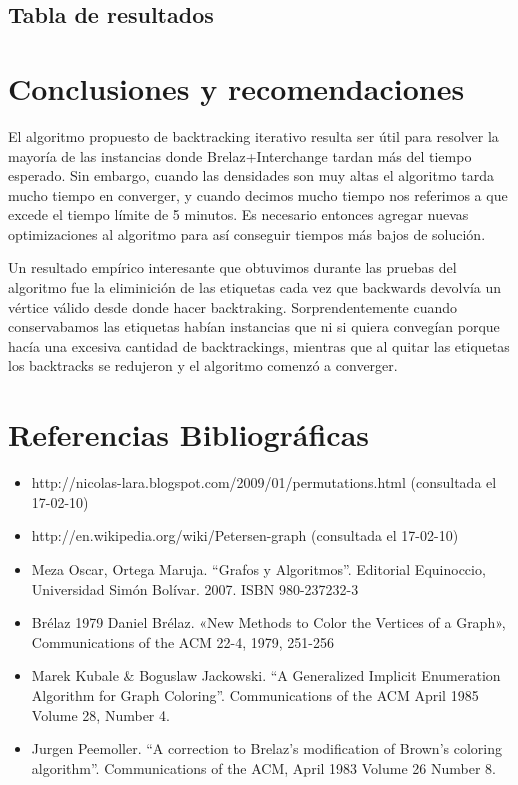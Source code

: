 \documentclass[a4paper,10pt]{article}
\begin{document}
\subsection{Tabla de resultados}
\newpage

\section{Conclusiones y recomendaciones}
El algoritmo propuesto de backtracking iterativo resulta ser 
útil para resolver la mayoría de las instancias donde Brelaz+Interchange 
tardan más del tiempo esperado. Sin embargo, cuando las densidades son muy altas 
el algoritmo tarda mucho tiempo en converger, y cuando decimos mucho tiempo nos referimos 
a que excede el tiempo límite de 5 minutos. Es necesario entonces agregar nuevas optimizaciones 
al algoritmo para así conseguir tiempos más bajos de solución. 

Un resultado empírico interesante que obtuvimos durante las pruebas del algoritmo fue 
la eliminición de las etiquetas cada vez que backwards devolvía un vértice válido desde 
donde hacer backtraking. Sorprendentemente cuando conservabamos las etiquetas habían instancias 
que ni si quiera convegían porque hacía una excesiva cantidad de backtrackings, mientras que al 
quitar las etiquetas los backtracks se redujeron y el algoritmo comenzó a converger.


\section{Referencias Bibliográficas}
\begin{itemize}
 \item http://nicolas-lara.blogspot.com/2009/01/permutations.html (consultada el 17-02-10)
 \item http://en.wikipedia.org/wiki/Petersen-graph (consultada el 17-02-10)
 \item Meza Oscar, Ortega Maruja. “Grafos y Algoritmos”. Editorial Equinoccio, Universidad Simón Bolívar. 2007. ISBN 980-237232-3
 \item Brélaz 1979 Daniel Brélaz. «New Methods to Color the Vertices of a Graph», Communications of the ACM 22-4, 1979, 251-256
 \item Marek Kubale & Boguslaw Jackowski. ``A Generalized Implicit Enumeration Algorithm for Graph Coloring''. Communications of the ACM April 1985 Volume 28, Number 4.
 \item Jurgen Peemoller. ``A correction to Brelaz's modification of Brown's coloring algorithm''. Communications of the ACM, April 1983 Volume 26 
	Number 8.
\end{itemize}
\end{document}
